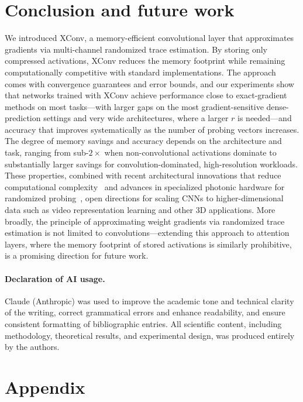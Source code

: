 \documentclass[10pt]{article}
\begin{document}
\section{Conclusion and future work}\label{conclusions}
We introduced XConv, a memory-efficient convolutional layer that approximates gradients via multi-channel randomized trace estimation. By storing only compressed activations, XConv reduces the memory footprint while remaining computationally competitive with standard implementations. The approach comes with convergence guarantees and error bounds, and our experiments show that networks trained with XConv achieve performance close to exact-gradient methods on most tasks---with larger gaps on the most gradient-sensitive dense-prediction settings and very wide architectures, where a larger $r$ is needed---and accuracy that improves systematically as the number of probing vectors increases. The degree of memory savings and accuracy depends on the architecture and task, ranging from sub-$2\times$ when non-convolutional activations dominate to substantially larger savings for convolution-dominated, high-resolution workloads. These properties, combined with recent architectural innovations that reduce computational complexity~\citep{howard2017mobilenets, liu2022convnet, chen2023vanillanet, chen2023fasternet} and advances in specialized photonic hardware for randomized probing~\citep{lightonproj}, open directions for scaling CNNs to higher-dimensional data such as video representation learning and other 3D applications. More broadly, the principle of approximating weight gradients via randomized trace estimation is not limited to convolutions---extending this approach to attention layers, where the memory footprint of stored activations is similarly prohibitive, is a promising direction for future work.


\paragraph{Declaration of AI usage.} Claude (Anthropic) was used to improve the academic tone and technical clarity of the writing, correct grammatical errors and enhance readability, and ensure consistent formatting of bibliographic entries. All scientific content, including methodology, theoretical results, and experimental design, was produced entirely by the authors.




\appendix
\section{Appendix}\label{annexes}
\end{document}
